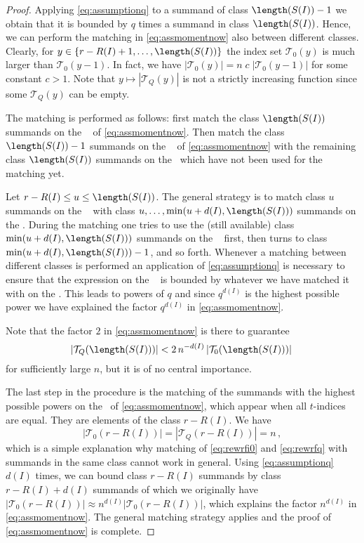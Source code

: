 \begin{proof}
Applying \eqref{eq:assumptionq} to a summand of class $\length(S(I))-1$ we obtain that it is bounded by $q$ times a summand in class $\length(S(I))$. Hence, we can perform the matching in \eqref{eq:assmomentnow} also between different classes. Clearly, for $y\in\{ r-R(I)+1,\ldots,\length(S(I))\}$ the index set $\mathcal{T}_0(y)$ is much larger than $\mathcal{T}_0(y-1)$. In fact, we have $|\mathcal{T}_0(y)|=n\; c\;|\mathcal{T}_0(y-1)|$ for some constant $c>1$. Note that $y\mapsto |\mathcal{T}_Q(y)|$ is not a strictly increasing function since some $\mathcal{T}_Q(y)$ can be empty. 

The matching is performed as follows: first match the class $\length(S(I))$ summands on the \lhs~ of \eqref{eq:assmomentnow}. Then match the class $\length(S(I))-1$ summands on the \lhs~ of \eqref{eq:assmomentnow} with the remaining class $\length(S(I))$ summands on the \rhs~which have not been used for the matching yet. 

Let $r-R(I)\le u\le \length(S(I))$. The general strategy is to match class $u$ summands on the \lhs~ with class $u,\ldots,\min(u+d(I),\length(S(I)))$ summands on the \rhs. During the matching one tries to use the (still available) class $\min(u+d(I),\length(S(I)))$ summands on the \rhs~ first, then turns to class $\min(u+d(I),\length(S(I)))-1$, and so forth. Whenever a matching between different classes is performed an application of \eqref{eq:assumptionq} is necessary to ensure that the expression on the \lhs~ is bounded by whatever we have matched it with on the \rhs. This leads to powers of $q$ and since $q^{d(I)}$ is the highest possible power we have explained the factor $q^{d(I)}$ in  \eqref{eq:assmomentnow}.
\par
Note that the factor $2$ in  \eqref{eq:assmomentnow} is there to guarantee 
\begin{equation*}
|\mathcal{T}_Q(\length(S(I)))|< 2\, n^{-d(I)} \, |\mathcal{T}_0(\length(S(I)))|\,
\end{equation*}
for sufficiently large $n$, but it is of no central importance. 

The last step in the procedure is the matching of the summands with the highest possible powers on the \lhs~of \eqref{eq:assmomentnow}, which appear when all $t$-indices are equal. They are elements of the class $r-R(I)$. We have
\begin{equation*}
|\mathcal{T}_0(r-R(I))|=|\mathcal{T}_Q(r-R(I))|=n\,,
\end{equation*}
which is a simple explanation why matching of \eqref{eq:rewrfi0} and \eqref{eq:rewrfq} with summands in the same class cannot work in general. Using \eqref{eq:assumptionq} $d(I)$ times, we can bound class $r-R(I)$ summands by class $r-R(I)+d(I)$ summands of which we originally have $|\mathcal{T}_0(r-R(I))|\approx n^{d(I)}|\mathcal{T}_0(r-R(I))|$, which explains the factor $n^{d(I)}$ in \eqref{eq:assmomentnow}. The general matching strategy applies and the proof of \eqref{eq:assmomentnow} is complete.
\end{proof}








